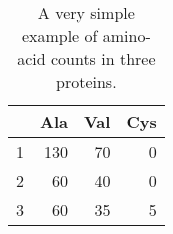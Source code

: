 \begin{table}[ht]
\begin{center}
\begin{tabular}{rrrr}
\hline
 & Ala & Val & Cys \\
\hline
1 & 130 & 70 & 0 \\
2 & 60 & 40 & 0 \\
3 & 60 & 35 & 5 \\
\hline
\end{tabular}
\caption{A very simple example of amino-acid counts in three proteins.}
\label{df}
\end{center}
\end{table}
